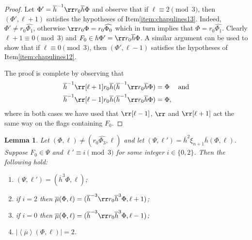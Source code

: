 \documentclass[final]{amsart}
\theoremstyle{plain}
\newtheorem{lemma}[thm]{Lemma}
\theoremstyle{definition}
\theoremstyle{remark}
\numberwithin{equation}{section}
\renewcommand{\{}{\lbrace}
\renewcommand{\}}{\rbrace}
\renewcommand{\bar}{\overline}
\renewcommand{\hat}{\widehat}
\newcommand{\kng}{{h}}
\newcommand{\etab}{\bar{\kng}}
\newcommand{\mub}{\bar{\mu}}
\newcommand{\te}{\xi}
\begin{document}
\begin{proof}
  Let $\Phi' = \etab^{-1} \rr r_{0} \etab \Phi$ and observe that if $\ell \equiv 2 \pmod{3}$, then $(\Phi',\ell+1)$ satisfies the hypotheses of Item\nobreakspace \ref {item:chapulines13}.
  Indeed, $\Phi' \neq r_{0} \hat{\Phi_{1}}$, otherwise $\rr r_{0} \Phi =  r_{0} \hat{\Phi_{0}}$ which in turn implies that $\Phi = r_{0} \hat{\Phi_{1}}$.
  Clearly $\ell+1 \equiv 0 \pmod{3}$ and $F_{0} \in \kng \Phi' = \rr r_{0} \etab \Phi$.
  A similar argument can be used to show that if $\ell \equiv 0 \pmod{3}$, then $(\Phi',\ell-1)$ satisfies the hypotheses of Item\nobreakspace \ref {item:chapulines12}.

  The proof is complete by observing that
  \[\begin{aligned}
  \etab^{-1} \rr[\ell+1] r_{0} \etab
  (\etab^{-1} \rr r_{0} \etab \Phi) &= \Phi &\text{and} \\
  \etab^{-1} \rr[\ell-1] r_{0} \etab (\etab^{-1} \rr r_{0} \etab \Phi) &= \Phi,
    \end{aligned}
  \]
  where in both cases we have used that $\rr[\ell-1]$, $ \rr$ and $\rr[\ell+1]$ act the same way on the flags containing $F_0$.
\end{proof}






\begin{lemma}\label{lem:chapulines2}
Let $(\Phi,\ell) \neq (r_0 \hat{\Phi_3},\ell)$ and let $(\Psi,\ell') =  \etab^{2} \te_{n+1} \etab (\Phi,\ell)$.
Suppose $F_0 \in \Psi$ and $\ell' \equiv i \pmod 3$ for some integer $i\in \{0,2\}$. 
Then the following hold:
\begin{enumerate}
    \item \label{item:chapulines21} $(\Psi,\ell') = (\etab^{3}\Phi, \ell)$;
\item \label{item:chapulines22} if $i = 2$ then $\mub(\Phi,\ell) = (\etab^{-3} \rr r_0 \etab^3 \Phi,\ell+1)$;
    \item \label{item:chapulines23} if $i = 0$ then $\mub(\Phi,\ell) = (\etab^{-3} \rr r_0 \etab^3 \Phi,\ell-1)$;
    \item \label{item:chapulines24}$ |\left\langle \mub \right\rangle (\Phi,\ell)| = 2$. 
\end{enumerate}




\end{lemma}
\end{document}
